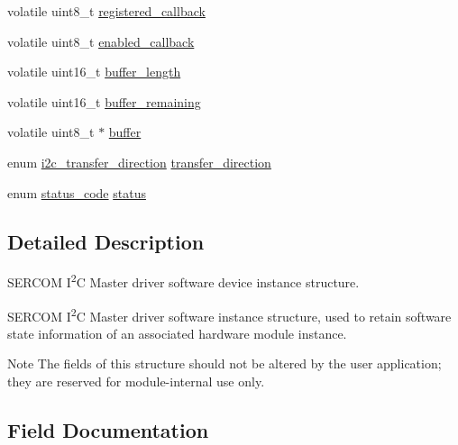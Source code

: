 \begin{DoxyCompactItemize}
volatile uint8\+\_\+t \mbox{\hyperlink{structi2c__master__module_a9b4084f9afb73a1aa2f9a81a197f8ce6}{registered\+\_\+callback}}
\item 
volatile uint8\+\_\+t \mbox{\hyperlink{structi2c__master__module_a88dcc0d45e96ac358f7e095040d108bc}{enabled\+\_\+callback}}
\item 
volatile uint16\+\_\+t \mbox{\hyperlink{structi2c__master__module_a149ef4844e3a4bb01d6053708adffbd8}{buffer\+\_\+length}}
\item 
volatile uint16\+\_\+t \mbox{\hyperlink{structi2c__master__module_a00442fe2f5fae2d3dea85e60687a6278}{buffer\+\_\+remaining}}
\item 
volatile uint8\+\_\+t $\ast$ \mbox{\hyperlink{structi2c__master__module_aa7542874ce444194205767bb46b42b5f}{buffer}}
\item 
enum \mbox{\hyperlink{i2c__common_8h_ad7ea327439ceaf6931b91865d12449fc}{i2c\+\_\+transfer\+\_\+direction}} \mbox{\hyperlink{structi2c__master__module_a0629187cb02ff04ad38fde4d546be4d1}{transfer\+\_\+direction}}
\item 
enum \mbox{\hyperlink{group__group__sam0__utils__status__codes_ga751c892e5a46b8e7d282085a5a5bf151}{status\+\_\+code}} \mbox{\hyperlink{structi2c__master__module_a30c0453c8af1896546c1ab0142be3181}{status}}
\end{DoxyCompactItemize}


\subsection{Detailed Description}
S\+E\+R\+C\+OM I\textsuperscript{2}C Master driver software device instance structure. 

S\+E\+R\+C\+OM I\textsuperscript{2}C Master driver software instance structure, used to retain software state information of an associated hardware module instance.

\begin{DoxyNote}{Note}
The fields of this structure should not be altered by the user application; they are reserved for module-\/internal use only. 
\end{DoxyNote}


\subsection{Field Documentation}
\mbox{\label{structi2c__master__module_aa7542874ce444194205767bb46b42b5f}} 
